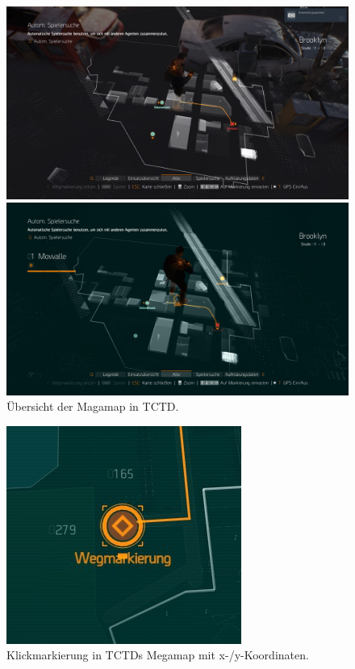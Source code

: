 \begin{figure}[h!]
    \centering
    \includegraphics[width=\linewidth]{figures/concept/the_division_overlap}

    \includegraphics[width=\linewidth]{figures/concept/the_division_5}
    
    \caption{Übersicht der Magamap in TCTD.}
    \label{fig:tctd_overview}
\end{figure}

\begin{figure}[tbh]
    \centering
    \includegraphics[width=0.3\linewidth]{figures/concept/the_division_clickmarker_x}
    \caption{Klickmarkierung in TCTDs Megamap mit x-/y-Koordinaten.}
    \label{fig:tctd_clickmarker}
\end{figure}

